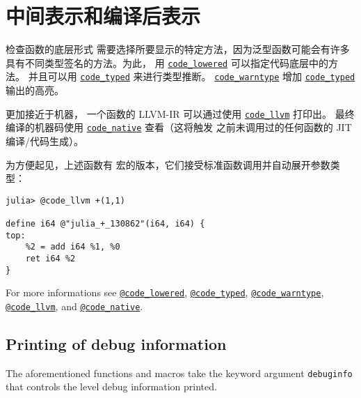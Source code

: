 \hypertarget{12950313890789848047}{}


\section{中间表示和编译后表示}



检查函数的底层形式 需要选择所要显示的特定方法，因为泛型函数可能会有许多具有不同类型签名的方法。为此， 用 \hyperlink{18235967286596219009}{\texttt{code\_lowered}} 可以指定代码底层中的方法。 并且可以用  \hyperlink{14801595959157535515}{\texttt{code\_typed}} 来进行类型推断。 \hyperlink{5565852192659724503}{\texttt{code\_warntype}} 增加 \hyperlink{14801595959157535515}{\texttt{code\_typed}} 输出的高亮。



更加接近于机器， 一个函数的 LLVM-IR 可以通过使用 \hyperlink{1749471484368489435}{\texttt{code\_llvm}} 打印出。 最终编译的机器码使用 \hyperlink{2534314152947301270}{\texttt{code\_native}} 查看（这将触发 之前未调用过的任何函数的 JIT 编译/代码生成）。



为方便起见，上述函数有 宏的版本，它们接受标准函数调用并自动展开参数类型：




\begin{verbatim}
julia> @code_llvm +(1,1)

define i64 @"julia_+_130862"(i64, i64) {
top:
    %2 = add i64 %1, %0
    ret i64 %2
}
\end{verbatim}



For more informations see \hyperlink{1376948972689074219}{\texttt{@code\_lowered}}, \hyperlink{6823997547688846780}{\texttt{@code\_typed}}, \hyperlink{8092893264277772840}{\texttt{@code\_warntype}}, \hyperlink{18039596607712979441}{\texttt{@code\_llvm}}, and \hyperlink{2629340111434042067}{\texttt{@code\_native}}.



\hypertarget{4254640328057635583}{}


\subsection{Printing of debug information}



The aforementioned functions and macros take the keyword argument \texttt{debuginfo} that controls the level debug information printed.




